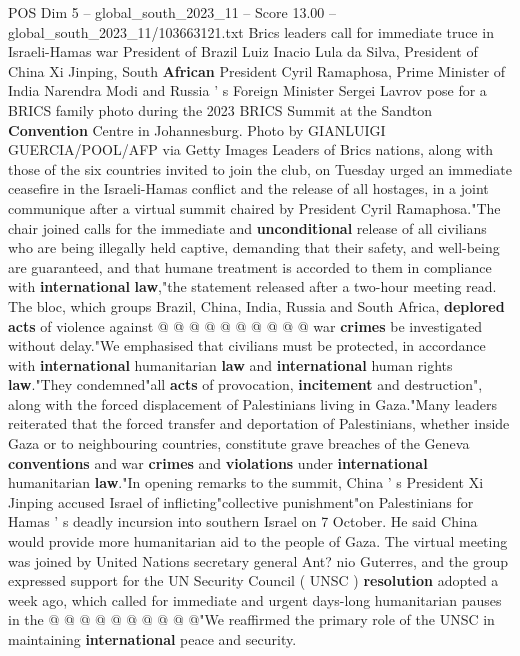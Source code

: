 \begin{textsample}{POS Dim 5 – global\_south\_2023\_11 – Score 13.00 – global\_south\_2023\_11/103663121.txt}  \label{ex:f5_pos_254}
Brics leaders call for immediate truce in Israeli-Hamas war President of Brazil Luiz Inacio Lula da Silva, President of China Xi Jinping, South \textbf{African} President Cyril Ramaphosa, Prime Minister of India Narendra Modi and Russia ' s Foreign Minister Sergei Lavrov pose for a BRICS family photo during the 2023 BRICS Summit at the Sandton \textbf{Convention} Centre in Johannesburg.
Photo by GIANLUIGI GUERCIA/POOL/AFP via Getty Images Leaders of Brics nations, along with those of the six countries invited to join the club, on Tuesday urged an immediate ceasefire in the Israeli-Hamas conflict and the release of all hostages, in a joint communique after a virtual summit chaired by President Cyril Ramaphosa."The chair joined calls for the immediate and \textbf{unconditional} release of all civilians who are being illegally held captive, demanding that their safety, and well-being are guaranteed, and that humane treatment is accorded to them in compliance with \textbf{international} \textbf{law},"the statement released after a two-hour meeting read.
The bloc, which groups Brazil, China, India, Russia and South Africa, \textbf{deplored} \textbf{acts} of violence against @ @ @ @ @ @ @ @ @ @ war \textbf{crimes} be investigated without delay."We emphasised that civilians must be protected, in accordance with \textbf{international} humanitarian \textbf{law} and \textbf{international} human rights \textbf{law}."They condemned"all \textbf{acts} of provocation, \textbf{incitement} and destruction", along with the forced displacement of Palestinians living in Gaza."Many leaders reiterated that the forced transfer and deportation of Palestinians, whether inside Gaza or to neighbouring countries, constitute grave breaches of the Geneva \textbf{conventions} and war \textbf{crimes} and \textbf{violations} under \textbf{international} humanitarian \textbf{law}."In opening remarks to the summit, China ' s President Xi Jinping accused Israel of inflicting"collective punishment"on Palestinians for Hamas ' s deadly incursion into southern Israel on 7 October.
He said China would provide more humanitarian aid to the people of Gaza.
The virtual meeting was joined by United Nations secretary general Ant? nio Guterres, and the group expressed support for the UN Security Council ( UNSC ) \textbf{resolution} adopted a week ago, which called for immediate and urgent days-long humanitarian pauses in the @ @ @ @ @ @ @ @ @ @"We reaffirmed the primary role of the UNSC in maintaining \textbf{international} peace and security.

\end{textsample}
